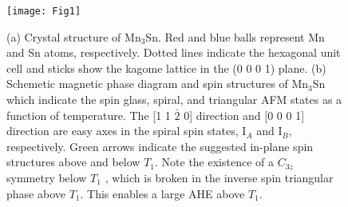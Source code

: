 \documentclass[prb,twocolumn,showpacs,preprintnumbers,amsmath,amssymb]{revtex4}
\begin{document}




\begin{figure}
\centering
\texttt{[image: Fig1]}
\caption{
(a) Crystal structure of Mn$_3$Sn. Red and blue balls represent Mn and Sn atoms, respectively.
Dotted lines indicate the hexagonal unit cell and sticks show the kagome lattice in the (0 0 0 1) plane. 
(b) Schemetic magnetic phase diagram and spin structures of Mn$_3$Sn which indicate the spin glass, spiral, and triangular AFM states as a function of temperature.
The [1 1 $\bar{2}$ 0] direction and [0 0 0 1] direction are easy axes in the spiral spin states, I$_A$ and I$_B$, respectively.\cite{APL2015}
Green arrows indicate the suggested in-plane spin structures above and below $T_1$. Note the existence of a $C_{3z}$ symmetry below $T_1$ , which is broken in the inverse spin triangular phase above $T_1$. This enables a large AHE above $T_1$.
}\label{fig:fig04(Mn3Sn)}
\end{figure}
\end{document}
